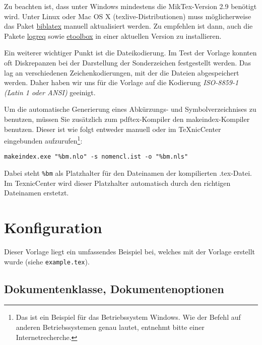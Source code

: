 Zu beachten ist, dass unter Windows mindestens die MikTex-Version 2.9 benötigt wird. Unter Linux oder Mac OS X (texlive-Distributionen) muss möglicherweise das Paket \href{http://ctan.org/tex-archive/macros/latex/contrib/biblatex}{biblatex} manuell aktualisiert werden. Zu empfehlen ist dann, auch die Pakete \href{http://ctan.org/tex-archive/macros/latex/contrib/logreq}{logreq} sowie \href{http://ctan.org/tex-archive/macros/latex/contrib/etoolbox}{etoolbox} in einer aktuellen Version zu installieren.

Ein weiterer wichtiger Punkt ist die Dateikodierung. Im Test der Vorlage konnten oft Diskrepanzen bei der Darstellung der Sonderzeichen festgestellt werden. Das lag an verschiedenen Zeichenkodierungen, mit der die Dateien abgespeichert werden. Daher haben wir uns für die Vorlage auf die Kodierung \emph{ISO-8859-1 (Latin 1 oder ANSI)} geeinigt.

Um die automatische Generierung eines Abkürzungs- und Symbolverzeichnises zu benutzen, müssen Sie zusätzlich zum pdftex-Kompiler den makeindex-Kompiler benutzen. Dieser ist wie folgt entweder manuell oder im TeXnicCenter eingebunden aufzurufen\footnote{Das ist ein Beispiel für das Betriebssystem Windows. Wie der Befehl auf anderen Betriebssystemen genau lautet, entnehmt bitte einer Internetrecherche.}:

\noindent \begin{center} \verb|makeindex.exe "%bm.nlo" -s nomencl.ist -o "%bm.nls"| \end{center}

\noindent Dabei steht \verb|%bm| als Platzhalter für den Dateinamen der kompilierten .tex-Datei. Im TexnicCenter wird dieser Platzhalter automatisch durch den richtigen Dateinamen erstetzt.


\section{Konfiguration}

Dieser Vorlage liegt ein umfassendes Beispiel bei, welches mit der Vorlage erstellt wurde (siehe \verb-example.tex-).


\subsection{Dokumentenklasse, Dokumentenoptionen}


